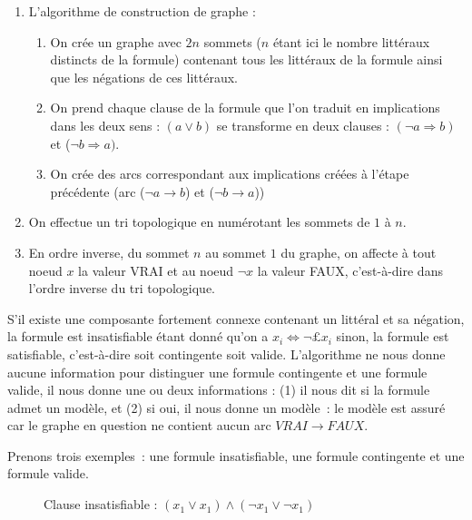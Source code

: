 \documentclass{article}
\begin{document}
\begin{enumerate}
\item L'algorithme de construction de graphe : 
\begin{enumerate}
\item On crée un graphe avec $2n$ sommets ($n$ étant ici le nombre littéraux distincts de la formule) contenant tous les littéraux de la
  formule ainsi que les négations de ces littéraux.
\item On prend chaque clause de la formule que l'on traduit en implications dans les deux sens : $(a \vee b)$ 
se transforme en deux clauses : $(\neg a \Rightarrow b)$ et ($\neg b \Rightarrow a)$.
\item On crée des arcs correspondant aux implications créées à l'étape précédente (arc ($\neg a 
\rightarrow b$) et ($\neg b \rightarrow a$))
\end{enumerate}
\item On effectue un tri topologique en numérotant les sommets de $1$ à $n$.
\item En ordre inverse, du sommet $n$ au sommet $1$ du graphe, on affecte à tout noeud $x$ la valeur VRAI et au noeud $\neg x$ la valeur
  FAUX, c'est-à-dire dans l'ordre inverse du tri topologique.
\end{enumerate}  	

S'il existe une composante fortement connexe contenant un littéral et sa négation, la formule est insatisfiable étant donné qu'on a $x_{i}
\Leftrightarrow \neg £x_{i}$ sinon, la formule est satisfiable, c'est-à-dire soit contingente soit valide. L'algorithme ne nous donne aucune
information pour distinguer une formule contingente et une formule valide, il nous donne une ou deux informations : (1) il nous dit si la
formule admet un modèle, et (2) si oui, il nous donne un modèle~: le modèle est assuré car le graphe en question ne contient aucun arc $VRAI
\rightarrow FAUX$.

Prenons trois exemples~: une formule insatisfiable, une formule contingente et une formule valide.

\begin{figure}[h!]
  \centering
  \caption{Clause insatisfiable : $(x_{1} \vee x_{1}) \wedge (\neg x_{1} \vee \neg x_{1})$}
  \label{fig:clause-insat}
\end{figure}
\end{document}
